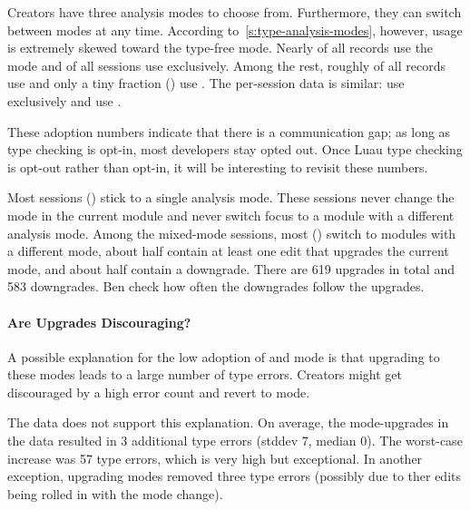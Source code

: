 \documentclass[english,submission,cleveref]{programming}
\begin{document}
Creators have three analysis modes to choose from.
Furthermore, they can switch between modes at any time.
According to~\cref{s:type-analysis-modes}, however, usage is
extremely skewed toward the type-free \mnocheck{} mode.
Nearly  of all records use the \mnocheck{} mode
and  of all sessions use \mnocheck{} exclusively.
Among the rest, roughly  of all records use \mnonstrict{} and only a
tiny fraction () use \mstrict{}.
The per-session data is similar:  use \mnonstrict{} exclusively
and  use \mstrict{}.


These adoption numbers indicate that there is a communication gap;
as long as type checking is opt-in, most developers stay opted out.
Once Luau type checking is opt-out rather than opt-in, it will be interesting
to revisit these numbers.

Most sessions () stick to a single analysis mode.
These sessions never change the mode in the current module and never switch
focus to a module with a different analysis mode.
Among the mixed-mode sessions, most () switch to modules with
a different mode, about half contain at least one edit that upgrades the
current mode, and about half contain a downgrade.
There are 619 upgrades in total and 583 downgrades.
\FILL{} Ben check how often the downgrades follow the upgrades.


\paragraph{Are Upgrades Discouraging?}


A possible explanation for the low adoption of \mnonstrict{} and
\mstrict{} mode is that upgrading to these modes leads to a large
number of type errors.
Creators might get discouraged by a high error count and revert to
\mnocheck{} mode.

The data does not support this explanation.
On average, the mode-upgrades in the data resulted in 3 additional
type errors (stddev 7, median 0).
The worst-case increase was 57 type errors, which is very high
but exceptional.
In another exception, upgrading modes removed three type errors
(possibly due to ther edits being rolled in with the
mode change).
\end{document}
